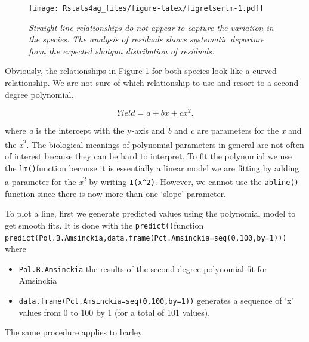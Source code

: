 \documentclass[letterpaper,]{book}
\providecommand{\tightlist}{%
  \setlength{\itemsep}{0pt}\setlength{\parskip}{0pt}}
\begin{document}
\begin{figure}
\centering
\texttt{[image: Rstats4ag\_files/figure-latex/figrelserlm-1.pdf]}
\caption{\label{fig:figrelserlm}\emph{Straight line relationships do not appear to capture the variation in the species. The analysis of residuals shows systematic departure form the expected shotgun distribution of residuals.}}
\end{figure}

Obviously, the relationships in Figure \ref{fig:figrelserlm} for both species look like a curved relationship. We are not sure of which relationship to use and resort to a second degree polynomial.

\[Yield = a+bx+cx^2 .\]

where \emph{a} is the intercept with the y-axis and \emph{b} and \emph{c} are parameters for the \emph{x} and the \emph{x}\textsuperscript{2}.
The biological meanings of polynomial parameters in general are not often of interest because they can be hard to interpret. To fit the polynomial we use the \texttt{lm()}function because it is essentially a linear model we are fitting by adding a parameter for the \emph{x}\textsuperscript{2} by writing \texttt{I(x\^{}2)}. However, we cannot use the \texttt{abline()} function since there is now more than one `slope' parameter.

To plot a line, first we generate predicted values using the polynomial model to get smooth fits. It is done with the \texttt{predict()}function \texttt{predict(Pol.B.Amsinckia,data.frame(Pct.Amsinckia=seq(0,100,by=1)))}
where

\begin{itemize}
\tightlist
\item
  \texttt{Pol.B.Amsinckia} the results of the second degree polynomial fit for Amsinckia
\item
  \texttt{data.frame(Pct.Amsinckia=seq(0,100,by=1))} generates a sequence of `x' values from 0 to 100 by 1 (for a total of 101 values).
\end{itemize}

The same procedure applies to barley.
\end{document}

